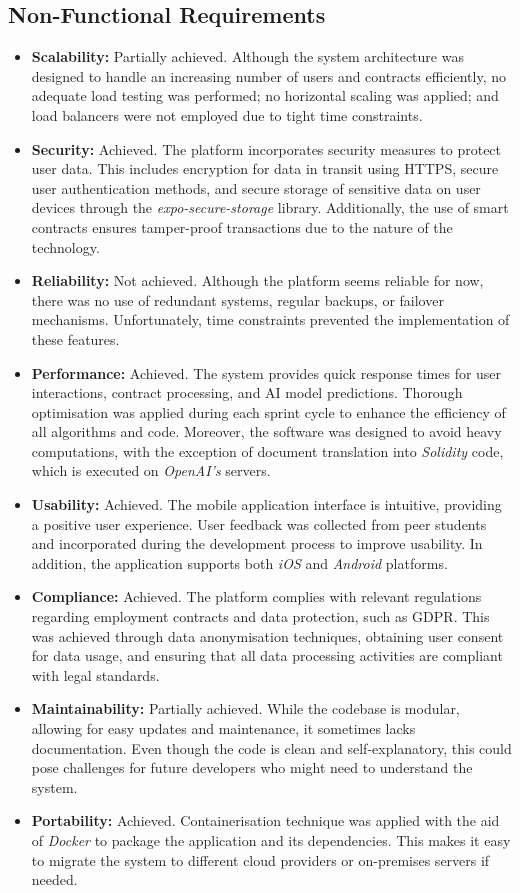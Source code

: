 \subsection{Non-Functional Requirements}

\begin{itemize}
    \item \textbf{Scalability:} Partially achieved. Although the system architecture was designed to handle an increasing number of users and contracts efficiently, no adequate load testing was performed; no horizontal scaling was applied; and load balancers were not employed due to tight time constraints.
    \item \textbf{Security:} Achieved. The platform incorporates security measures to protect user data. This includes encryption for data in transit using HTTPS, secure user authentication methods, and secure storage of sensitive data on user devices through the \textit{expo-secure-storage} library. Additionally, the use of smart contracts ensures tamper-proof transactions due to the nature of the technology.
    \item \textbf{Reliability:} Not achieved. Although the platform seems reliable for now, there was no use of redundant systems, regular backups, or failover mechanisms. Unfortunately, time constraints prevented the implementation of these features.
    \item \textbf{Performance:} Achieved. The system provides quick response times for user interactions, contract processing, and AI model predictions. Thorough optimisation was applied during each sprint cycle to enhance the efficiency of all algorithms and code. Moreover, the software was designed to avoid heavy computations, with the exception of document translation into \textit{Solidity} code, which is executed on \textit{OpenAI's} servers.
    \item \textbf{Usability:} Achieved. The mobile application interface is intuitive, providing a positive user experience. User feedback was collected from peer students and incorporated during the development process to improve usability. In addition, the application supports both \textit{iOS} and \textit{Android} platforms.
    \item \textbf{Compliance:} Achieved. The platform complies with relevant regulations regarding employment contracts and data protection, such as GDPR. This was achieved through data anonymisation techniques, obtaining user consent for data usage, and ensuring that all data processing activities are compliant with legal standards.
    \item \textbf{Maintainability:} Partially achieved. While the codebase is modular, allowing for easy updates and maintenance, it sometimes lacks documentation. Even though the code is clean and self-explanatory, this could pose challenges for future developers who might need to understand the system.
    \item \textbf{Portability:} Achieved. Containerisation technique was applied with the aid of \textit{Docker} to package the application and its dependencies. This makes it easy to migrate the system to different cloud providers or on-premises servers if needed.
\end{itemize}

